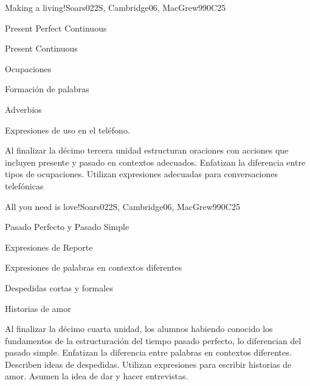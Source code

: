 \begin{syllabus}
\begin{unit}{Making a living!}{}{Soars022S, Cambridge06, MacGrew99}{0}{C25}
   \begin{topics}
      \item Present Perfect Continuous
      \item Present Continuous
      \item Ocupaciones 
      \item Formación de palabras
      \item Adverbios
      \item Expresiones de uso en el teléfono.
   \end{topics}

   \begin{learningoutcomes}
      \item Al finalizar la décimo tercera unidad estructuran oraciones con acciones que incluyen presente y pasado en contextos adecuados. Enfatizan la diferencia entre tipos de ocupaciones. Utilizan expresiones adecuadas para conversaciones telefónicas
   \end{learningoutcomes}
\end{unit}

\begin{unit}{All you need is love!}{}{Soars022S, Cambridge06, MacGrew99}{0}{C25}
   \begin{topics}
      \item Pasado Perfecto y Pasado Simple
      \item Expresiones de Reporte
      \item Expresiones de palabras en contextos diferentes 
      \item Despedidas cortas y formales 
      \item Historias de amor
   \end{topics}

   \begin{learningoutcomes}
      \item Al finalizar la décimo cuarta unidad, los alumnos habiendo conocido los fundamentos de la estructuración del tiempo pasado perfecto, lo diferencian del pasado simple. Enfatizan la diferencia entre palabras en contextos diferentes. Describen ideas de despedidas. Utilizan expresiones para escribir historias de amor. Asumen la idea de dar y hacer entrevistas.
   \end{learningoutcomes}
\end{unit}

\begin{coursebibliography}
\end{coursebibliography}

\end{syllabus}
%
